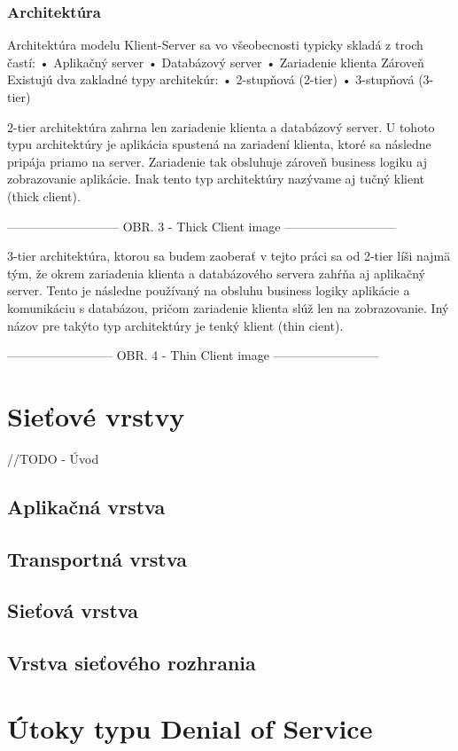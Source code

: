 \documentclass[
  printed, %
  table,   %
  lof,     %
  lot,     %
]{fithesis3}
\begin{document}
\subsection{Architektúra}
Architektúra modelu Klient-Server sa vo všeobecnosti typicky skladá z troch 
častí:
	• Aplikačný server
	• Databázový server
	• Zariadenie klienta
Zároveň Existujú dva zakladné typy architekúr: 
	• 2-stupňová (2-tier)
	• 3-stupňová (3-tier)

2-tier architektúra zahrna len zariadenie klienta a databázový server. U tohoto
typu architektúry je aplikácia spustená na zariadení klienta, ktoré sa následne
pripája priamo na server. Zariadenie tak obsluhuje zároveň business logiku aj
zobrazovanie aplikácie. Inak tento typ architektúry nazývame aj tučný klient
(thick client).

---------------------------
OBR. 3 - Thick Client image
---------------------------

3-tier architektúra, ktorou sa budem zaoberať v tejto práci sa od 2-tier líši najmä
tým, že okrem zariadenia klienta a databázového servera zahŕňa aj aplikačný server.
Tento je následne používaný na obsluhu business logiky aplikácie a komunikáciu s
databázou, pričom zariadenie klienta slúž len na zobrazovanie. Iný názov pre takýto
typ architektúry je tenký klient (thin cient).

--------------------------
OBR. 4 - Thin Client image
--------------------------

\chapter{Sieťové vrstvy}
//TODO - Úvod
\section{Aplikačná vrstva}
\section{Transportná vrstva}
\section{Sieťová vrstva}
\section{Vrstva sieťového rozhrania}

\chapter{Útoky typu Denial of Service}
\end{document}
